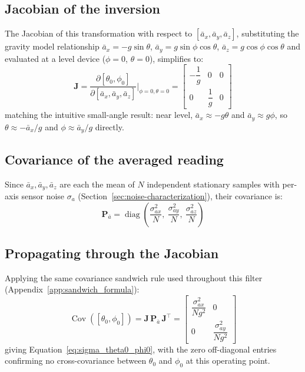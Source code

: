 \documentclass[12pt,a4paper]{article}
\begin{document}
{\subsection{Jacobian of the inversion}

The Jacobian of this transformation with respect to
$[\bar{a}_x,\bar{a}_y,\bar{a}_z]$, substituting the gravity model
relationship $\bar{a}_x=-g\sin\theta$, $\bar{a}_y=g\sin\phi\cos\theta$,
$\bar{a}_z=g\cos\phi\cos\theta$ and evaluated at a level device
($\phi=0$, $\theta=0$), simplifies to:
\begin{equation}
  \bm{J} = \frac{\partial[\theta_0,\phi_0]}{\partial[\bar{a}_x,\bar{a}_y,\bar{a}_z]}
  \bigg|_{\phi=0,\theta=0}
  = \begin{bmatrix} -\dfrac{1}{g} & 0 & 0 \\[6pt] 0 & \dfrac{1}{g} & 0 \end{bmatrix}
  \label{eq:J_angle_init}
\end{equation}
matching the intuitive small-angle result: near level, $\bar{a}_x
\approx -g\theta$ and $\bar{a}_y \approx g\phi$, so
$\theta \approx -\bar{a}_x/g$ and $\phi \approx \bar{a}_y/g$ directly.

\subsection{Covariance of the averaged reading}

Since $\bar{a}_x, \bar{a}_y, \bar{a}_z$ are each the mean of $N$
independent stationary samples with per-axis sensor noise $\sigma_a$
(Section~\ref{sec:noise-characterization}), their covariance is:
\begin{equation}
  \bm{P}_{\bar{a}} = \operatorname{diag}\!\left(\frac{\sigma_{ax}^2}{N},\ \frac{\sigma_{ay}^2}{N},\ \frac{\sigma_{az}^2}{N}\right)
\end{equation}

\subsection{Propagating through the Jacobian}

Applying the same covariance sandwich rule used throughout this filter
(Appendix~\ref{app:sandwich_formula}):
\begin{equation}
  \operatorname{Cov}([\theta_0,\phi_0]) = \bm{J}\,\bm{P}_{\bar{a}}\,\bm{J}^\top
  = \begin{bmatrix} \dfrac{\sigma_{ax}^2}{N g^2} & 0 \\[6pt] 0 & \dfrac{\sigma_{ay}^2}{N g^2} \end{bmatrix}
  \label{eq:cov_angle_init}
\end{equation}
giving Equation~\eqref{eq:sigma_theta0_phi0}, with the zero
off-diagonal entries confirming no cross-covariance between $\theta_0$
and $\phi_0$ at this operating point.

}
\end{document}

